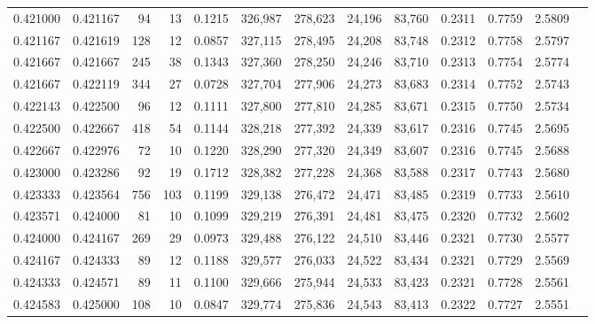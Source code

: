 \begin{tabular}{rrrrrrrrrrrrr}
0.421000 & 0.421167 &    94 &  13 &                                     0.1215 & 326,987 & 278,623 &  24,196 &  83,760 & 0.2311 & 0.7759 & 2.5809 \\
0.421167 & 0.421619 &   128 &  12 &                                     0.0857 & 327,115 & 278,495 &  24,208 &  83,748 & 0.2312 & 0.7758 & 2.5797 \\
0.421667 & 0.421667 &   245 &  38 &                                     0.1343 & 327,360 & 278,250 &  24,246 &  83,710 & 0.2313 & 0.7754 & 2.5774 \\
0.421667 & 0.422119 &   344 &  27 &                                     0.0728 & 327,704 & 277,906 &  24,273 &  83,683 & 0.2314 & 0.7752 & 2.5743 \\
0.422143 & 0.422500 &    96 &  12 &                                     0.1111 & 327,800 & 277,810 &  24,285 &  83,671 & 0.2315 & 0.7750 & 2.5734 \\
0.422500 & 0.422667 &   418 &  54 &                                     0.1144 & 328,218 & 277,392 &  24,339 &  83,617 & 0.2316 & 0.7745 & 2.5695 \\
0.422667 & 0.422976 &    72 &  10 &                                     0.1220 & 328,290 & 277,320 &  24,349 &  83,607 & 0.2316 & 0.7745 & 2.5688 \\
0.423000 & 0.423286 &    92 &  19 &                                     0.1712 & 328,382 & 277,228 &  24,368 &  83,588 & 0.2317 & 0.7743 & 2.5680 \\
0.423333 & 0.423564 &   756 & 103 &                                     0.1199 & 329,138 & 276,472 &  24,471 &  83,485 & 0.2319 & 0.7733 & 2.5610 \\
0.423571 & 0.424000 &    81 &  10 &                                     0.1099 & 329,219 & 276,391 &  24,481 &  83,475 & 0.2320 & 0.7732 & 2.5602 \\
0.424000 & 0.424167 &   269 &  29 &                                     0.0973 & 329,488 & 276,122 &  24,510 &  83,446 & 0.2321 & 0.7730 & 2.5577 \\
0.424167 & 0.424333 &    89 &  12 &                                     0.1188 & 329,577 & 276,033 &  24,522 &  83,434 & 0.2321 & 0.7729 & 2.5569 \\
0.424333 & 0.424571 &    89 &  11 &                                     0.1100 & 329,666 & 275,944 &  24,533 &  83,423 & 0.2321 & 0.7728 & 2.5561 \\
0.424583 & 0.425000 &   108 &  10 &                                     0.0847 & 329,774 & 275,836 &  24,543 &  83,413 & 0.2322 & 0.7727 & 2.5551 \\

\end{tabular}

